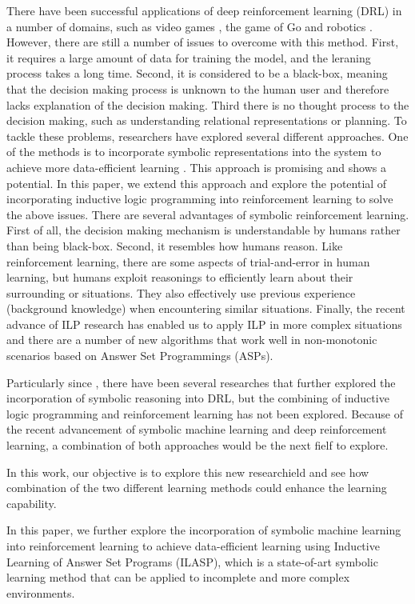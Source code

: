 \documentclass[12pt,twoside]{report}
\begin{document}
There have been successful applications of deep reinforcement learning (DRL) in a number of domains, such as video games \cite{Mnih2015}, the game of Go \cite{Silver2016} and robotics \cite{Levine2015}. However, there are still a number of issues to overcome with this method.
First, it requires a large amount of data for training the model, and the leraning process takes a long time.
Second, it is considered to be a black-box, meaning that the decision making process is unknown to the human user and therefore lacks explanation of the decision making. Third there is no thought process to the decision making, such as understanding relational representations or planning.
To tackle these problems, researchers have explored several different approaches.
One of the methods is to incorporate symbolic representations into the system to achieve more data-efficient learning \cite{Garnelo2016}. This approach is promising and shows a potential.
In this paper, we extend this approach and explore the potential of incorporating inductive logic programming into reinforcement learning to solve the above issues.
There are several advantages of symbolic reinforcement learning. First of all, the decision making mechanism is understandable by humans rather than being black-box.
Second, it resembles how humans reason. Like reinforcement learning, there are some aspects of trial-and-error in human learning, but humans exploit reasonings to efficiently learn about their surrounding or situations. They also effectively use previous experience (background knowledge) when encountering similar situations.
Finally, the recent advance of ILP research has enabled us to apply ILP in more complex situations and there are a number of new algorithms that work well in non-monotonic scenarios based on Answer Set Programmings (ASPs).

Particularly since \cite{Garnelo2016}, there have been several researches that further explored the incorporation of symbolic reasoning into DRL, but the combining of inductive logic programming and reinforcement learning has not been explored.
Because of the recent advancement of symbolic machine learning and deep reinforcement learning, a combination of both approaches would be the next fielf to explore.

In this work, our objective is to explore this new researchield and see how combination of the two different learning methods could enhance the learning capability.

In this paper, we further explore the incorporation of symbolic machine learning into reinforcement learning to achieve data-efficient learning using Inductive Learning of Answer Set Programs (ILASP), which is a state-of-art symbolic learning method that can be applied to incomplete and more complex environments.
\end{document}
